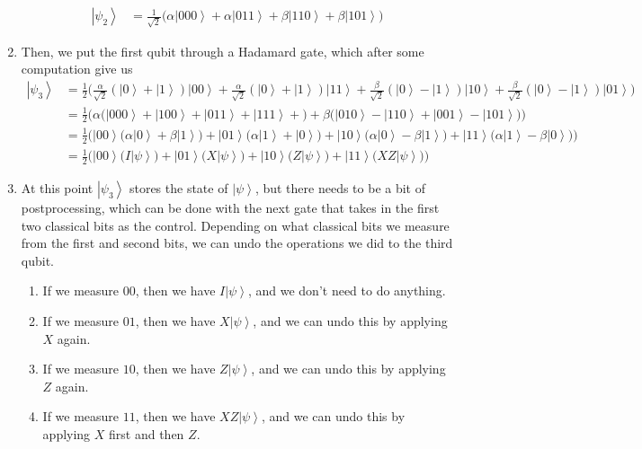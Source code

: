 \documentclass{article}
\newcommand{\ket}[1]{\ensuremath{\left|#1\right\rangle}}
\begin{document}
\begin{theorem}
\begin{enumerate}
          \begin{align} 
            \ket{\psi_2} & = \frac{1}{\sqrt{2}} \big( \alpha \ket{000} + \alpha \ket{011} + \beta \ket{110} + \beta \ket{101} \big)
          \end{align}
        \item Then, we put the first qubit through a Hadamard gate, which after some computation give us 
          \begin{align*} 
            \ket{\psi_3} & = \frac{1}{2} \bigg( \frac{\alpha}{\sqrt{2}} (\ket{0} + \ket{1}) \ket{00} + \frac{\alpha}{\sqrt{2}} (\ket{0} + \ket{1}) \ket{11}  + \frac{\beta}{\sqrt{2}} (\ket{0} - \ket{1} ) \ket{10} + \frac{\beta}{\sqrt{2}} ( \ket{0} - \ket{1}) \ket{01} \bigg) \\
                         & = \frac{1}{2} \bigg( \alpha \big( \ket{000} + \ket{100} + \ket{011} + \ket{111} + \big) + \beta \big( \ket{010} - \ket{110} + \ket{001} - \ket{101} \big)\bigg) \\
                         & = \frac{1}{2} \bigg( \ket{00} \big( \alpha \ket{0} + \beta \ket{1} \big) + \ket{01} \big( \alpha \ket{1} + \ket{0} \big) + \ket{10} \big( \alpha \ket{0} - \beta \ket{1} \big) + \ket{11} \big( \alpha \ket{1} - \beta \ket{0} \big) \bigg) \\
                         & = \frac{1}{2} \bigg( \ket{00} \big( I \ket{\psi}\big) + \ket{01} \big( X \ket{\psi} \big)  + \ket{10} \big(Z \ket{\psi}\big) + \ket{11} \big( X Z \ket{\psi} \big) \bigg)
          \end{align*}
        \item At this point $\ket{\psi_3}$ stores the state of $\ket{\psi}$, but there needs to be a bit of postprocessing, which can be done with the next gate that takes in the first two classical bits as the control. Depending on what classical bits we measure from the first and second bits, we can undo the operations we did to the third qubit. 
          \begin{enumerate} 
            \item If we measure $00$, then we have $I \ket{\psi}$, and we don't need to do anything. 
            \item If we measure $01$, then we have $X \ket{\psi}$, and we can undo this by applying $X$ again. 
            \item If we measure $10$, then we have $Z \ket{\psi}$, and we can undo this by applying $Z$ again.
            \item If we measure $11$, then we have $X Z \ket{\psi}$, and we can undo this by applying $X$ first and then $Z$. 
          \end{enumerate}
      \end{enumerate}
    \end{theorem}
\end{document}
